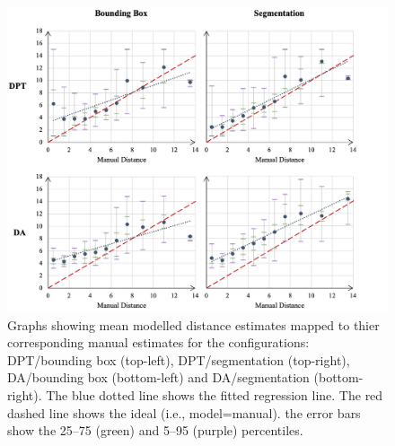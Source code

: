 \begin{figure}[p]
    \centering
    \vspace{1cm}
    \includegraphics[width=1.01\textwidth]{body/analysis/assets/distance_graphs/averages}
    \caption{Graphs showing mean modelled distance estimates mapped to thier corresponding manual
    estimates for the configurations: DPT/bounding box (top-left), DPT/segmentation (top-right),
        DA/bounding box (bottom-left) and DA/segmentation (bottom-right). The blue dotted line
        shows the fitted regression line. The red dashed line shows the ideal (i.e., model=manual).
        the error bars show the 25–75 (green) and 5–95 (purple) percentiles.}
    \label{fig:distance_comparison}
\end{figure}

